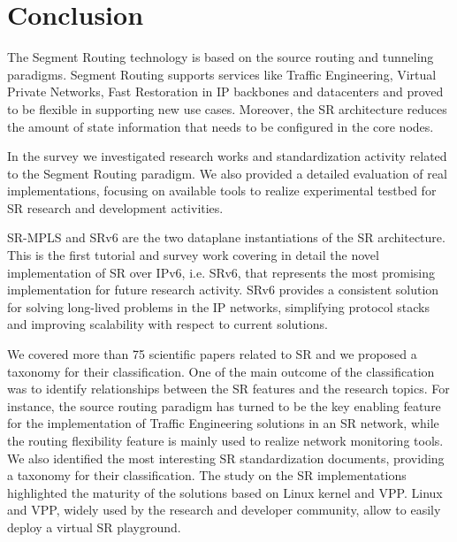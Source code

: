 \section{Conclusion}
\label{sec:conclusion}

The Segment Routing technology is based on the source routing and tunneling paradigms. Segment Routing supports services like Traffic Engineering, Virtual Private Networks, Fast Restoration in IP backbones and datacenters and proved to be flexible in supporting new use cases. Moreover, the SR architecture reduces the amount of state information that needs to be configured in the core nodes. 

In the survey we investigated research works and standardization activity related to the Segment Routing paradigm. We also provided a detailed evaluation of real implementations, focusing on available tools to realize experimental testbed for SR research and development activities.

SR-MPLS and SRv6 are the two dataplane instantiations of the SR architecture. This is the first tutorial and survey work covering in detail the novel implementation of SR over IPv6, i.e. SRv6, that represents the most promising implementation for future research activity. SRv6 provides a consistent solution for solving long-lived problems in the IP networks, simplifying protocol stacks and improving scalability with respect to current solutions.

\begin{comment}
To the best of our knowledge, there is only another survey about Segment Routing, namely \cite{abdullah2018segment}, which focuses on SR-MPLS and only mentions SRv6 architecture and lacks of an analysis of the standardization efforts and implementation results.
\end{comment}

We covered more than 75 scientific papers related to SR and we proposed a taxonomy for their classification. One of the main outcome of the classification was to identify relationships between the SR features and the research topics. For instance, the source routing paradigm has turned to be the key enabling feature for the implementation of Traffic Engineering solutions in an SR network, while the routing flexibility feature is mainly used to realize network monitoring tools. We also identified the most interesting SR standardization documents, providing a taxonomy for their classification. The study on the SR implementations highlighted the maturity of the solutions based on Linux kernel and VPP. Linux and VPP, widely used by the research and developer community, allow to easily deploy a virtual SR playground. 

